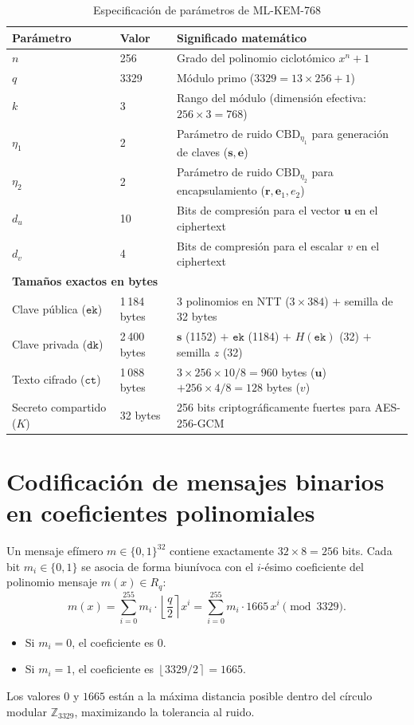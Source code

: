 \documentclass[11pt,a4paper,twoside,openright]{book}
\theoremstyle{plain}
\theoremstyle{definition}
\theoremstyle{remark}
\newcommand{\Z}{\mathbb{Z}}
\newcommand{\Rq}{R_q}
\newcommand{\vv}[1]{\mathbf{#1}}
\newcommand{\round}[1]{\left\lfloor #1 \right\rceil}
\newcommand{\CBD}{\mathrm{CBD}}
\begin{document}
\begin{table}[H]
\centering
\caption{Especificaci\'on de par\'ametros de ML-KEM-768}
\label{tab:especificacion_mlkem768}
\begin{tabular}{lll}
\toprule
\textbf{Par\'ametro} & \textbf{Valor} & \textbf{Significado matem\'atico} \\
\midrule
$n$ & 256 & Grado del polinomio ciclot\'omico $x^n + 1$ \\
$q$ & 3329 & M\'odulo primo ($3329 = 13 \times 256 + 1$) \\
$k$ & 3 & Rango del m\'odulo (dimensi\'on efectiva: $256 \times 3 = 768$) \\
$\eta_1$ & 2 & Par\'ametro de ruido $\CBD_{\eta_1}$ para generaci\'on de claves ($\vv{s}, \vv{e}$) \\
$\eta_2$ & 2 & Par\'ametro de ruido $\CBD_{\eta_2}$ para encapsulamiento ($\vv{r}, \vv{e}_1, e_2$) \\
$d_u$ & 10 & Bits de compresi\'on para el vector $\vv{u}$ en el ciphertext \\
$d_v$ & 4 & Bits de compresi\'on para el escalar $v$ en el ciphertext \\
\midrule
\multicolumn{3}{l}{\textbf{Tama\~nos exactos en bytes}} \\
Clave p\'ublica ($\mathtt{ek}$) & 1\,184 bytes & 3 polinomios en NTT ($3 \times 384$) $+$ semilla de 32 bytes \\
Clave privada ($\mathtt{dk}$) & 2\,400 bytes & $\vv{s}$ (1152) $+$ $\mathtt{ek}$ (1184) $+$ $H(\mathtt{ek})$ (32) $+$ semilla $z$ (32) \\
Texto cifrado ($\mathtt{ct}$) & 1\,088 bytes & $3 \times 256 \times 10/8 = 960$ bytes ($\vv{u}$) $+ 256 \times 4/8 = 128$ bytes ($v$) \\
Secreto compartido ($K$) & 32 bytes & 256 bits criptogr\'aficamente fuertes para AES-256-GCM \\
\bottomrule
\end{tabular}
\end{table}

\section{Codificaci\'on de mensajes binarios en coeficientes polinomiales}

Un mensaje ef\'imero $m \in \{0, 1\}^{32}$ contiene exactamente $32 \times 8 = 256$ bits. Cada bit $m_i \in \{0, 1\}$ se asocia de forma biun\'ivoca con el $i$-\'esimo coeficiente del polinomio mensaje $m(x) \in \Rq$:
\[
  m(x) = \sum_{i=0}^{255} m_i \cdot \round{\frac{q}{2}} x^i = \sum_{i=0}^{255} m_i \cdot 1665 \, x^i \pmod{3329}.
\]
\begin{itemize}
  \item Si $m_i = 0$, el coeficiente es $0$.
  \item Si $m_i = 1$, el coeficiente es $\round{3329 / 2} = 1665$.
\end{itemize}
Los valores $0$ y $1665$ est\'an a la m\'axima distancia posible dentro del c\'irculo modular $\Z_{3329}$, maximizando la tolerancia al ruido.
\end{document}
